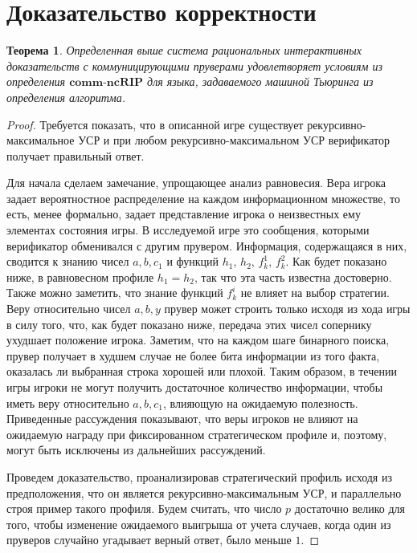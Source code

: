 \documentclass[14pt, a4paper]{extreport}
\newtheorem{theorem}{\indent Теорема}
\begin{document}
        \section{Доказательство корректности}
        \begin{theorem}Определенная выше система рациональных интерактивных доказательств с коммуницирующими пруверами удовлетворяет условиям из определения $\textbf{comm-ncRIP}$ для языка, задаваемого машиной Тьюринга из определения алгоритма.\end{theorem}
        \begin{proof}Требуется показать, что в описанной игре существует рекурсивно-максимальное УСР и при любом рекурсивно-максимальном УСР верификатор получает правильный ответ.

            Для начала сделаем замечание, упрощающее анализ равновесия. Вера игрока задает вероятностное распределение на каждом информационном множестве, то есть, менее формально, задает представление игрока о неизвестных ему элементах состояния игры. В исследуемой игре это сообщения, которыми верификатор обменивался с другим прувером. Информация, содержащаяся в них, сводится к знанию чисел $a, b, c_1$ и функций $h_1$, $h_2$, $f^1_k$, $f^2_k$. Как будет показано ниже, в равновесном профиле $h_1 = h_2$, так что эта часть известна достоверно. Также можно заметить, что знание функций $f^i_k$ не влияет на выбор стратегии. Веру относительно чисел $a, b, y$ прувер может строить только исходя из хода игры в силу того, что, как будет показано ниже, передача этих чисел сопернику ухудшает положение игрока. Заметим, что на каждом шаге бинарного поиска, прувер получает в худшем случае не более бита информации из того факта, оказалась ли выбранная строка хорошей или плохой. Таким образом, в течении игры игроки не могут получить достаточное количество информации, чтобы иметь веру относительно $a, b, c_1$, влияющую на ожидаемую полезность. Приведенные рассуждения показывают, что веры игроков не влияют на ожидаемую награду при фиксированном стратегическом профиле и, поэтому, могут быть исключены из дальнейших рассуждений.

        Проведем доказательство, проанализировав стратегический профиль исходя из предположения, что он является рекурсивно-максимальным УСР, и параллельно строя пример такого профиля. Будем считать, что число $p$ достаточно велико для того, чтобы изменение ожидаемого выигрыша от учета случаев, когда один из пруверов случайно угадывает верный ответ, было меньше $1$.


\end{proof}
\end{document}
